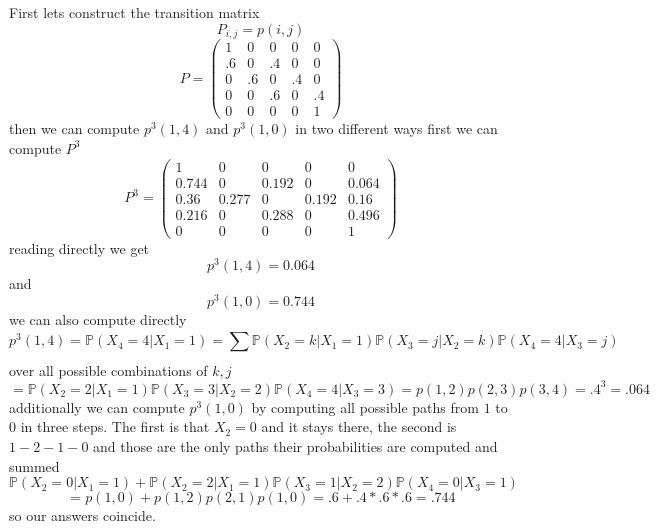 \documentclass[11pt]{article}
\begin{document}
First lets construct the transition matrix
 \[
     P_{i,j} = p(i,j)
\] 
\[
 P =
 \begin{pmatrix} 1 & 0 & 0 & 0 & 0\\
     .6 & 0 & .4 & 0 & 0\\
     0 & .6 & 0 & .4 & 0\\
     0 & 0 & .6 & 0 & .4\\
     0 & 0 & 0 & 0 & 1
 \end{pmatrix} 
\] 
then we can compute $p^{3}(1,4)$ and $p^{3}(1,0)$ in two different ways
first we can compute $P^{3}$ 
\[
P^{3} = \begin{pmatrix} 
    1 & 0 & 0 & 0 & 0\\
    0.744 & 0 & 0.192 & 0 & 0.064\\
    0.36 & 0.277 & 0 & 0.192 & 0.16\\
    0.216 & 0 & 0.288 & 0 & 0.496\\
    0 & 0 & 0 & 0 & 1
\end{pmatrix} 
\] 
reading directly we get
\[
p^{3}(1,4) = 0.064
\] 
and
\[
p^{3}(1,0) = 0.744
\] 
we can also compute directly
\[
    p^{3}(1,4) = \mathbb{P}(X_4 = 4 | X_1 = 1) = \sum_{}^{} \mathbb{P}(X_2 = k | X_1 =1) \mathbb{P}(X_3 = j | X_2 = k) \mathbb{P}(X_4 = 4 | X_3 = j)
\] 
over all possible combinations of $k,j$
\[
= \mathbb{P}(X_2=2|X_1=1) \mathbb{P}(X_3=3|X_2=2) \mathbb{P}(X_4=4 |X_3=3) = p(1,2)p(2,3)p(3,4) = .4^{3} = .064
\] 
additionally we can compute $p^{3}(1,0)$ by computing all possible paths from $1$ to $0$ in three steps. The first is that  $X_2 = 0$ and it stays there,
the second is $1-2-1-0$ and those are the only paths their probabilities are computed and summed
 \[
 \mathbb{P}(X_2 = 0 | X_1 = 1) + \mathbb{P}(X_2 = 2| X_1=1) \mathbb{P}(X_3 = 1| X_2 = 2) \mathbb{P}(X_4 = 0 | X_3 = 1) 
\]\[
=p(1,0) + p(1,2)p(2,1)p(1,0) = .6 + .4 * .6 * .6 = .744
\] 
so our answers coincide.
\end{document}
